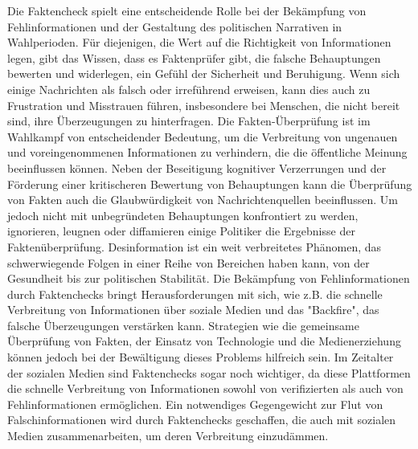\documentclass[a4paper,listof=totoc,bibliography=totoc]{scrartcl}
\begin{document}
Die Faktencheck spielt eine entscheidende Rolle bei der Bekämpfung von Fehlinformationen und der Gestaltung des politischen Narrativen in Wahlperioden. 
Für diejenigen, die Wert auf die Richtigkeit von Informationen legen, gibt das Wissen, dass es Faktenprüfer gibt, die falsche Behauptungen bewerten und 
widerlegen, ein Gefühl der Sicherheit und Beruhigung. Wenn sich einige Nachrichten als falsch oder irreführend erweisen, kann dies auch zu Frustration und 
Misstrauen führen, insbesondere bei Menschen, die nicht bereit sind, ihre Überzeugungen zu hinterfragen. 
Die Fakten-Überprüfung ist im Wahlkampf von entscheidender Bedeutung, um die Verbreitung von ungenauen und voreingenommenen Informationen zu verhindern, die 
die öffentliche Meinung beeinflussen können. Neben der Beseitigung kognitiver Verzerrungen und der Förderung einer kritischeren Bewertung von Behauptungen 
kann die Überprüfung von Fakten auch die Glaubwürdigkeit von Nachrichtenquellen beeinflussen. Um jedoch nicht mit unbegründeten Behauptungen konfrontiert 
zu werden, ignorieren, leugnen oder diffamieren einige Politiker die Ergebnisse der Faktenüberprüfung. 
Desinformation ist ein weit verbreitetes Phänomen, das schwerwiegende Folgen in einer Reihe von Bereichen haben kann, von der Gesundheit bis zur politischen 
Stabilität. Die Bekämpfung von Fehlinformationen durch Faktenchecks bringt Herausforderungen mit sich, wie z.B. die schnelle Verbreitung von Informationen über 
soziale Medien und das "Backfire", das falsche Überzeugungen verstärken kann. Strategien wie die gemeinsame Überprüfung von Fakten, der Einsatz von Technologie 
und die Medienerziehung können jedoch bei der Bewältigung dieses Problems hilfreich sein. 
Im Zeitalter der sozialen Medien sind Faktenchecks sogar noch wichtiger, da diese Plattformen die schnelle Verbreitung von Informationen sowohl von verifizierten 
als auch von Fehlinformationen ermöglichen. Ein notwendiges Gegengewicht zur Flut von Falschinformationen wird durch Faktenchecks geschaffen, die auch mit sozialen 
Medien zusammenarbeiten, um deren Verbreitung einzudämmen.\newline
\end{document}
